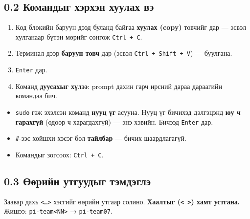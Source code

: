 \hypertarget{ux43aux43eux43cux430ux43dux434ux44bux433-ux445ux44dux440ux445ux44dux43d-ux445ux443ux443ux43bux430ux445-ux432ux44d}{%
\subsection{0.2 Командыг хэрхэн хуулах вэ}\label{ux43aux43eux43cux430ux43dux434ux44bux433-ux445ux44dux440ux445ux44dux43d-ux445ux443ux443ux43bux430ux445-ux432ux44d}}

\begin{enumerate}
\def\labelenumi{\arabic{enumi}.}
\tightlist
\item
  Код блокийн баруун дээд буланд байгаа \textbf{хуулах (copy)} товчийг дар --- эсвэл хулганаар бүтэн мөрийг сонгож \texttt{Ctrl\ +\ C}.
\item
  Терминал дээр \textbf{баруун товч} дар (эсвэл \texttt{Ctrl\ +\ Shift\ +\ V}) --- буулгана.
\item
  \texttt{Enter} дар.
\item
  Команд \textbf{дуусахыг хүлээ}: prompt дахин гарч ирсний дараа дараагийн командаа бич.
\end{enumerate}

\begin{itemize}
\tightlist
\item
  \texttt{sudo} гэж эхэлсэн команд \textbf{нууц үг} асууна. Нууц үг бичихэд дэлгэцэнд \textbf{юу ч гарахгүй} (одоор ч харагдахгүй) --- энэ хэвийн. Бичээд \texttt{Enter} дар.
\item
  \texttt{\#}-ээс хойшхи хэсэг бол \textbf{тайлбар} --- бичих шаардлагагүй.
\item
  Командыг зогсоох: \texttt{Ctrl\ +\ C}.
\end{itemize}

\hypertarget{ux4e9ux4e9ux440ux438ux439ux43d-ux443ux442ux433ux443ux443ux434ux44bux433-ux442ux44dux43cux434ux44dux433ux43bux44d}{%
\subsection{0.3 Өөрийн утгуудыг тэмдэглэ}\label{ux4e9ux4e9ux440ux438ux439ux43d-ux443ux442ux433ux443ux443ux434ux44bux433-ux442ux44dux43cux434ux44dux433ux43bux44d}}

Заавар дахь \texttt{\textless{}\ldots{}\textgreater{}} хэсгийг өөрийн утгаар солино. \textbf{Хаалтыг (\texttt{\textless{}\ \textgreater{}}) хамт устгана.} Жишээ: \texttt{pi-team\textless{}NN\textgreater{}} → \texttt{pi-team07}.

